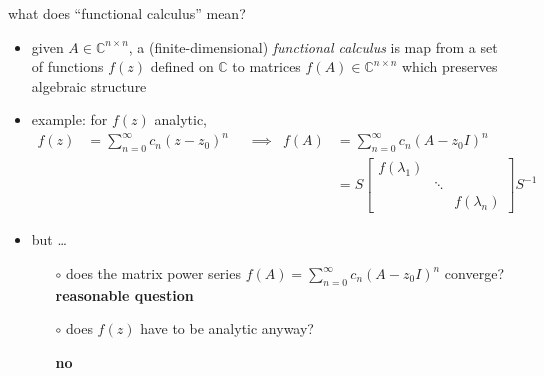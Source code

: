 \documentclass[10pt,hyperref]{beamer}
\newcommand{\CC}{\mathbb{C}}
\begin{document}
\begin{frame}{what does ``functional calculus'' mean?}

\begin{itemize}
\item given $A\in\CC^{n\times n}$, a (finite-dimensional) \emph{functional calculus} is map from a set of functions $f(z)$ defined on $\CC$ to matrices $f(A)\in\CC^{n\times n}$ which preserves algebraic structure
\item example: for $f(z)$ analytic,
\small
\begin{align*}
f(z) &= \sum_{n=0}^\infty c_n (z-z_0)^n & &\implies & f(A) &= \sum_{n=0}^\infty c_n (A-z_0 I)^n \\
     &&&& &= S \begin{bmatrix} f(\lambda_1) & & \\ & \ddots & \\ & & f(\lambda_n) \end{bmatrix} S^{-1}
\end{align*}
\normalsize
\item but \dots
    \begin{itemize}
    \item[$\circ$] does the matrix power series $f(A) = \sum_{n=0}^\infty c_n (A-z_0 I)^n$ converge? \textbf{reasonable question}
    \item[$\circ$] does $f(z)$ have to be analytic anyway?
    
     \textbf{no}
    \end{itemize}
\end{itemize}
\end{frame}
\end{document}
